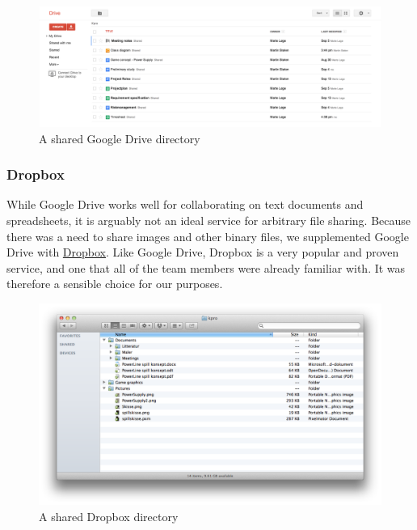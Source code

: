 \begin{figure}[htb]
  \centering
  \includegraphics[width=1\textwidth]{pictures/google_drive.png}
  \caption{A shared Google Drive directory}
\end{figure}

\subsubsection{Dropbox}
While Google Drive works well for collaborating on text documents and
spreadsheets, it is arguably not an ideal service for arbitrary file
sharing. Because there was a need to share images and other binary files, we
supplemented Google Drive with \href{https://www.dropbox.com/}{Dropbox}. Like
Google Drive, Dropbox is a very popular and proven service, and one that all of
the team members were already familiar with. It was therefore a sensible choice
for our purposes.

\begin{figure}[htb]
  \centering
  \includegraphics[width=1\textwidth]{pictures/dropbox.png}
  \caption{A shared Dropbox directory}
\end{figure}
